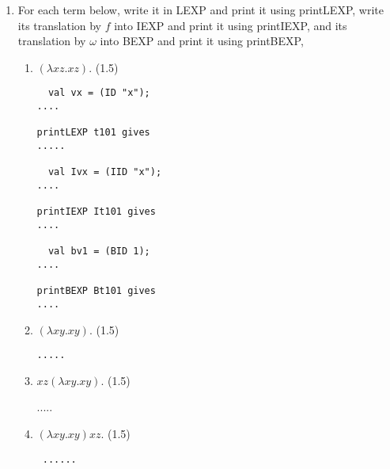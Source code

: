 \documentclass[11pt]{article}
\begin{document}
\begin{enumerate}
\color{black}
  
 \item
For each term below, write it in LEXP and print it using printLEXP, write its translation by $f$ into IEXP  and print it using printIEXP, and its translation by $\omega$ into BEXP  and print it using printBEXP, 
\begin{enumerate}
\item
$(\lambda xz.xz)$.
   \hfill{(1.5)} %
   
    \color{red}
  \begin{verbatim}
  val vx = (ID "x");
....

printLEXP t101 gives
.....

  val Ivx = (IID "x");
....

printIEXP It101 gives
....

  val bv1 = (BID 1);
....

printBEXP Bt101 gives
....
\end{verbatim}
\color{black}
  \item
$(\lambda xy.xy)$.
   \hfill{(1.5)} %
   
       \color{red}
  \begin{verbatim}
.....
\end{verbatim}
\color{black}
\item
$xz(\lambda xy.xy)$.
   \hfill{(1.5)} %
   
   \color{red}
   .....
\color{black}
   \item
$(\lambda xy.xy)xz$.
   \hfill{(1.5)} %
   
     \color{red}
  \begin{verbatim}
 ......
\end{verbatim}
\color{black}

\end{enumerate}
\end{enumerate}
\end{document}
